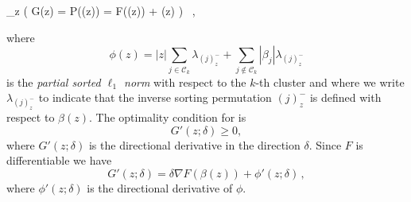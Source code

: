 \begin{problem}
\label{pb:cluster-problem}
\min_{z \in {}} \Big(
G(z) = P(\beta(z))  = F(\beta(z)) + \phi(z)
\Big) \,  ,
\end{problem}
where
\[
  \phi(z) = |z| \sum_{j \in \mathcal{C}_k} \lambda_{(j)^-_z}
  + \sum_{j \notin \mathcal{C}_k} |\beta_j| \lambda_{(j)^-_z}
\]
is the \emph{partial sorted \(\ell_1\) norm} with respect to the \(k\)-th cluster and where we write \(\lambda_{(j)^-_z}\) to indicate that the inverse sorting permutation \((j)^-_z\)
is defined with respect to \(\beta(z)\).
The optimality condition for  is
\[
  G'(z; \delta) \geq 0,
\]
where $G'(z; \delta) $ is the directional derivative in the direction $\delta$.
Since \(F\) is differentiable we have
\[
  G'(z; \delta)  = \delta \nabla F(\beta(z)) + \phi'(z; \delta) \, ,
\]
where \(\phi'(z; \delta)\) is the directional derivative of $\phi$.

